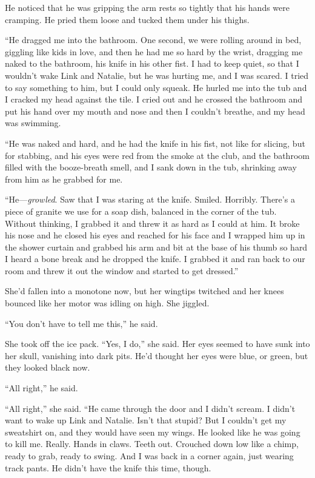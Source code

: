 He noticed that he was gripping the arm rests so tightly that his
hands were cramping.  He pried them loose and tucked them under his
thighs.

``He dragged me into the bathroom.  One second, we were rolling around
in bed, giggling like kids in love, and then he had me so hard by the
wrist, dragging me naked to the bathroom, his knife in his other fist. 
I had to keep quiet, so that I wouldn't wake Link and Natalie, but he
was hurting me, and I was scared.  I tried to say something to him,
but I could only squeak.  He hurled me into the tub and I cracked my
head against the tile.  I cried out and he crossed the bathroom and
put his hand over my mouth and nose and then I couldn't breathe, and
my head was swimming.

``He was naked and hard, and he had the knife in his fist, not like
for slicing, but for stabbing, and his eyes were red from the smoke at
the club, and the bathroom filled with the booze-breath smell, and I
sank down in the tub, shrinking away from him as he grabbed for me.

``He---\textit{growled}.  Saw that I was staring at the knife. 
Smiled.  Horribly.  There's a piece of granite we use for a soap dish,
balanced in the corner of the tub.  Without thinking, I grabbed it and
threw it as hard as I could at him.  It broke his nose and he closed
his eyes and reached for his face and I wrapped him up in the shower
curtain and grabbed his arm and bit at the base of his thumb so hard I
heard a bone break and he dropped the knife.  I grabbed it and ran
back to our room and threw it out the window and started to get
dressed.''

She'd fallen into a monotone now, but her wingtips twitched and her
knees bounced like her motor was idling on high.  She jiggled.

``You don't have to tell me this,'' he said.

She took off the ice pack.  ``Yes, I do,'' she said.  Her eyes seemed
to have sunk into her skull, vanishing into dark pits.  He'd thought
her eyes were blue, or green, but they looked black now.

``All right,'' he said.

``All right,'' she said.  ``He came through the door and I didn't
scream.  I didn't want to wake up Link and Natalie.  Isn't that
stupid?  But I couldn't get my sweatshirt on, and they would have seen
my wings.  He looked like he was going to kill me.  Really.  Hands in
claws.  Teeth out.  Crouched down low like a chimp, ready to grab,
ready to swing.  And I was back in a corner again, just wearing track
pants.  He didn't have the knife this time, though.

